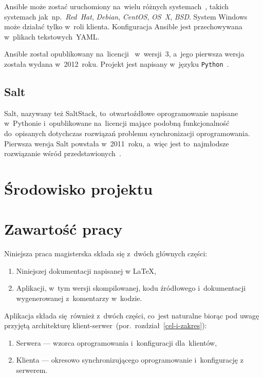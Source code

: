 \documentclass[thesis]{subfiles}
\begin{document}
Ansible może zostać uruchomiony na~wielu różnych systemach~, takich systemach jak~np.~\emph{Red~Hat}, \emph{Debian}, \emph{CentOS}, \emph{OS~X}, \emph{BSD}. System Windows może działać tylko w~roli klienta. Konfiguracja Ansible jest przechowywana w~plikach tekstowych~YAML.

Ansible został opublikowany na~licencji~ w~wersji~3, a~jego pierwsza wersja została wydana w~2012~roku. Projekt jest napisany w~języku \texttt{Python}~\cite{ansible,ansible-github}.


\subsection{Salt}

Salt, nazywany też SaltStack, to~otwartoźdłowe oprogramowanie napisane w~Pythonie i~opublikowane na~licencji  mające podobną funkcjonalność do~opisanych dotychczas rozwiązań problemu synchronizacji oprogramowania. Pierwsza wersja Salt powstała w~2011~roku, a~więc jest to~najmłodsze rozwiązanie wśród przedstawionych~\cite{saltstack}.


\section{Środowisko projektu}


\section{Zawartość pracy}

\noindent Niniejsza praca magisterska składa się z~dwóch głównych części:
\begin{enumerate}
	\item Niniejszej dokumentacji napisanej w \LaTeX,
	\item Aplikacji, w~tym wersji skompilowanej, kodu źródłowego i~dokumentacji wygenerowanej z~komentarzy w~kodzie.
\end{enumerate}
Aplikacja składa się~również z~dwóch części, co~jest naturalne biorąc pod uwagę przyjętą architekturę klient-serwer~(por.~rozdział~\ref{cel-i-zakres}):
\begin{enumerate}
	\item Serwera --- wzorca oprogramowania i~konfiguracji dla~klientów,
	\item Klienta --- okresowo synchronizującego oprogramowanie i~konfigurację z serwerem.
\end{enumerate}
\end{document}
